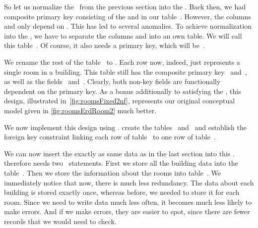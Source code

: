 %
%
%
%
%
So let us normalize the \db\ from the previous section into the .
Back then, we had composite primary key consisting of the  and  in our table~.
However, the columns  and  only depend on .
This has led to several anomalies.
To achieve normalization into the , we have to separate the columns  and  into an own table.
We will call this table~.
Of course, it also needs a primary key, which will be~.

We rename the rest of the table~ to .
Each row now, indeed, just represents a single room in a building.
This table still has the composite primary key~ and~, as well as the fields~ and~.
Clearly, both non-key fields are functionally dependent on the primary key.
As a bonus additionally to satisfying the , this design, illustrated in~\cref{fig:roomsFixed2nf}, represents our original conceptual model given in \cref{fig:roomsErdRoom2} much better.

We now implement this design using \sql.
 create the tables~ and~ and establish the foreign key constraint linking each row of table~ to one row of table~.

We can now insert the exactly as same data as in the last section into this \db.
 therefore needs two~ statements.
First we store all the building data into the table~.
Then we store the information about the rooms into table~.
We immediately notice that now, there is much less redundancy.
The data about each building is stored exactly once, whereas before, we needed to store it for each room.
Since we need to write data much less often, it becomes much less likely to make errors.
And if we make errors, they are easier to spot, since there are fewer records that we would need to check.


